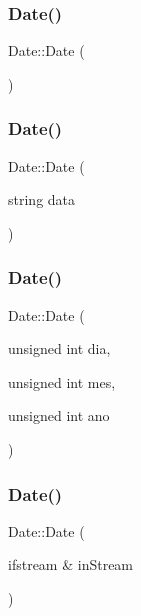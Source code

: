 \subsubsection{\texorpdfstring{Date()}{Date()}\hspace{0.1cm}{\footnotesize\ttfamily [1/4]}}
{\footnotesize\ttfamily Date\+::\+Date (\begin{DoxyParamCaption}{ }\end{DoxyParamCaption})}

\hypertarget{class_date_aed0ec4ac9e00fb6130f8a642a61180b9}{}\label{class_date_aed0ec4ac9e00fb6130f8a642a61180b9} 
\subsubsection{\texorpdfstring{Date()}{Date()}\hspace{0.1cm}{\footnotesize\ttfamily [2/4]}}
{\footnotesize\ttfamily Date\+::\+Date (\begin{DoxyParamCaption}\item[{string}]{data }\end{DoxyParamCaption})}

\hypertarget{class_date_ae0f1f3db515c009b0a9f77869edc7599}{}\label{class_date_ae0f1f3db515c009b0a9f77869edc7599} 
\subsubsection{\texorpdfstring{Date()}{Date()}\hspace{0.1cm}{\footnotesize\ttfamily [3/4]}}
{\footnotesize\ttfamily Date\+::\+Date (\begin{DoxyParamCaption}\item[{unsigned int}]{dia,  }\item[{unsigned int}]{mes,  }\item[{unsigned int}]{ano }\end{DoxyParamCaption})}

\hypertarget{class_date_a5b859c0abe4bcf936dc7a7124e079659}{}\label{class_date_a5b859c0abe4bcf936dc7a7124e079659} 
\subsubsection{\texorpdfstring{Date()}{Date()}\hspace{0.1cm}{\footnotesize\ttfamily [4/4]}}
{\footnotesize\ttfamily Date\+::\+Date (\begin{DoxyParamCaption}\item[{ifstream \&}]{in\+Stream }\end{DoxyParamCaption})}



